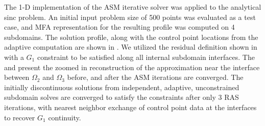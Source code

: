 The 1-D implementation of the ASM iterative solver was applied to the analytical sinc problem. An initial input problem size of 500 points was evaluated as a test case, and MFA representation for the resulting profile was computed on 4 subdomains. The solution profile, along with the control point locations from the adaptive computation are shown in . We utilized the residual definition shown in  with a $G_1$ constraint to be satisfied along all internal subdomain interfaces. The  and  present the zoomed in reconstruction of the approximation near the interface between $\Omega_2$ and $\Omega_3$ before, and after the ASM iterations are converged. The initially discontinuous solutions from independent, adaptive, unconstrained subdomain solves are converged to satisfy the constraints after only 3 RAS iterations, with nearest neighbor exchange of control point data at the interfaces to recover $G_1$ continuity.


